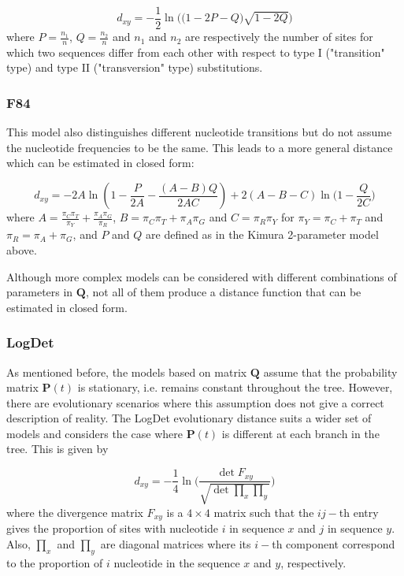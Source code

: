 \begin{equation}
d_{xy} = -\frac{1}{2}\ln\bigg( \big(1-2P-Q\big) \sqrt{1-2Q} \bigg)
\end{equation}
where $P=\frac{n_1}{n}$, $Q=\frac{n_2}{n}$ and $n_1$ and $n_2$ are respectively the number of sites for which two sequences differ from each other with respect to type I ("transition" type) and type II ("transversion" type) substitutions.

\subsubsection{F84}\label{F84_model}

This model \cite{F84} also distinguishes different nucleotide transitions but do not assume the nucleotide frequencies to be the same. This leads to a more general distance which can be estimated in closed form:

\begin{equation}
    d_{xy} = -2 A\ln\left( 1- \frac{P}{2A} - \frac{(A-B)Q}{2AC} \right) + 2(A-B-C)\ln\bigg( 1-\frac{Q}{2C} \bigg)
\label{eq:F84_distance}
\end{equation}
where $A = \frac{\pi_C \pi_T}{\pi_Y} + \frac{\pi_A \pi_G}{\pi_R}$, $B=\pi_C\pi_T + \pi_A\pi_G$ and $C=\pi_R\pi_Y$ for $\pi_Y = \pi_C + \pi_T$ and $\pi_R = \pi_A + \pi_G$, and $P$ and $Q$ are defined as in the Kimura 2-parameter model above.

Although more complex models can be considered with different combinations of parameters in $\mathbf{Q}$, not all of them produce a distance function that can be estimated in closed form. 

\subsubsection{LogDet}\label{LD_model}

As mentioned before, the models based on matrix $\mathbf{Q}$ assume that the probability matrix $\mathbf{P}(t)$ is stationary, i.e. remains constant throughout the tree. However, there are evolutionary scenarios where this assumption does not give a correct description of reality. The LogDet evolutionary distance \cite{L94} suits a wider set of models and considers the case where $\mathbf{P}(t)$ is different at each branch in the tree. This is given by

\begin{equation}
    d_{xy} = -\frac{1}{4}\ln\Bigg( \frac{\det F_{xy}}{\sqrt{\det \prod_x \prod_y}} \Bigg)
\label{eq:LogDet_distance}
\end{equation}
where the divergence matrix $F_{xy}$ is a $4\times 4$ matrix such that the $ij-$th entry gives the proportion of sites with nucleotide $i$ in sequence $x$ and $j$ in sequence $y$. Also, $\prod_x$ and $\prod_y$ are diagonal matrices where its $i-$th component correspond to the proportion of $i$ nucleotide in the sequence $x$ and $y$, respectively.

